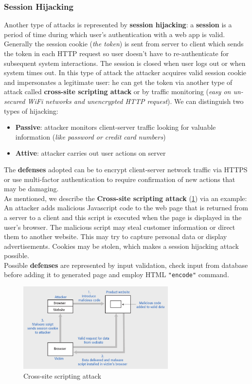 \documentclass[10pt,a4paper]{report}
\begin{document}
\subsubsection{Session Hijacking}
Another type of attacks is represented by \textbf{session hijacking}: a \textbf{session} is a period of time during which user's authentication with a web app is valid. Generally the session cookie (\textit{the token}) is sent from server to client which sends the token in each HTTP request so user doesn't have to re-authenticate for subsequent system interactions. The session is closed when user logs out or when system times out. In this type of attack the attacker acquires valid session cookie and impersonates a legitimate user: he can get the token via another type of attack called \textbf{cross-site scripting attack} or by traffic monitoring (\textit{easy on un-secured WiFi networks and unencrypted HTTP request}).
We can distinguish two types of hijacking:
\begin{itemize}
	\item \textbf{Passive}: attacker monitors client-server traffic looking for valuable information (\textit{like password or credit card numbers})
	\item \textbf{Attive}: attacker carries out user actions on server
\end{itemize}
The \textbf{defenses} adopted can be to encrypt client-server network traffic via HTTPS or use multi-factor authentication to require confirmation of new actions that may be damaging.\\
As mentioned, we describe the \textbf{Cross-site scripting attack} (\ref{image85}) via an example: An attacker adds malicious Javascript code to the web page that is returned from a server to a client and this script is executed when the
page is displayed in the user’s browser. The malicious script may steal customer information or direct them to
another website. This may try to capture personal data or display advertisements. Cookies may be stolen, which makes a session hijacking attack possible.\\
Possible \textbf{defenses} are represented by input validation, check input from database before adding it to generated page and employ HTML \texttt{"encode"} command. 
\begin{figure}[h]
	\centering
	\includegraphics[width=0.7\textwidth]{image85}
	\caption{Cross-site scripting attack}
	\label{image85}
\end{figure} 
\end{document}
